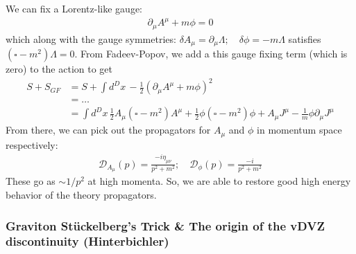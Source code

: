 \documentclass{book}
\theoremstyle{definition}
\newcommand{\p}{\partial}
\newcommand{\nn}{\nonumber}
\newcommand{\f}[2]{\frac{#1}{#2}}
\newcommand{\lp}{\left(}
\newcommand{\rp}{\right)}
\newcommand{\D}{\mathcal{D}}
\begin{document}
We can fix a Lorentz-like gauge:
\begin{align}
\p_\mu A^\mu + m\phi = 0
\end{align}
which along with the gauge symmetries: $\delta A_\mu = \p_\mu \Lambda; \quad \delta \phi = -m\Lambda$ satisfies $(\square - m^2)\Lambda = 0$. From Fadeev-Popov, we add a this gauge fixing term (which is zero) to the action to get
\begin{align}
S+ S_{GF} &= S + \int d^Dx\, -\f{1}{2}\lp \p_\mu A^\mu + m\phi \rp^2\nn\\
&= \dots\nn\\
&= \boxed{\int d^Dx\, \f{1}{2}A_\mu (\square - m^2)A^\mu + \f{1}{2}\phi(\square - m^2)\phi + A_\mu J^\mu - \f{1}{m}\phi \p_\mu J^\mu}
\end{align} 
From there, we can pick out the propagators for $A_\mu$ and $\phi$ in momentum space respectively:
\begin{align}
\boxed{\D_{A_\mu}(p) = \f{-i\eta_{\mu\nu}}{p^2 + m^2}; \quad \D_{\phi}(p) = \f{-i}{p^2 + m^2}}
\end{align}
These go as $\sim 1/p^2$ at high momenta. So, we are able to restore good high energy behavior of the theory propagators. 
























\subsubsection{Graviton St\"{u}ckelberg's Trick \& The origin of the vDVZ discontinuity (Hinterbichler)}
\end{document}
